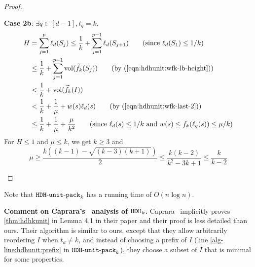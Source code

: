 \begin{proof}
\begin{optional}
\textbf{Case 2b}: $\exists q \in [d-1], t_q = k$.
\begin{align*}
H &= \sum_{j=1}^p \ell_d(S_j)
\le \frac{1}{k} + \sum_{j=1}^{p-1} \ell_d(S_{j+1})
\tag{since $\ell_d(S_1) \le 1/k$}
\\ &\le \frac{1}{k} + \sum_{j=1}^{p-1} \vol(\wfk(S_j))
\tag{by (\ref{eqn:hdhunit:wfk-lb-height})}
\\ &< \frac{1}{k} + \vol(\wfk(I))
\\ &< \frac{1}{k} + \frac{1}{\mu} + w(s)\ell_d(s)
\tag{by (\ref{eqn:hdhunit:wfk-last-2})}
\\ &\le \frac{1}{k} + \frac{1}{\mu} + \frac{\mu}{k^2}
\tag{since $\ell_d(s) \le 1/k$ and $w(s) \le f_k(\ell_q(s)) \le \mu/k$}
\end{align*}
For $H \le 1$ and $\mu \le k$, we get $k \ge 3$ and
\[ \mu \ge \frac{k((k-1) - \sqrt{(k-3)(k+1)})}{2}
    \le \frac{k(k-2)}{k^2-3k+1} \le \frac{k}{k-2} \]
\end{optional}
\end{proof}

Note that $\operatorname{\mathtt{HDH-unit-pack}}_k$ has a running time of $O(n\log n)$.

\textbf{Comment on Caprara's~\cite{caprara2008} analysis of $\operatorname{\mathtt{HDH}}_{k}$.}
Caprara~\cite{caprara2008} implicitly proves \cref{thm:hdhkunit} in Lemma 4.1 in their paper
and their proof is less detailed than ours.
Their algorithm is similar to ours, except that
they allow arbitrarily reordering $I$ when $t_d \neq k$,
and instead of choosing a prefix of $I$
(line \ref{alg-line:hdhunit:prefix} in $\operatorname{\mathtt{HDH-unit-pack}}_k$),
they choose a subset of $I$ that is minimal for some properties.
